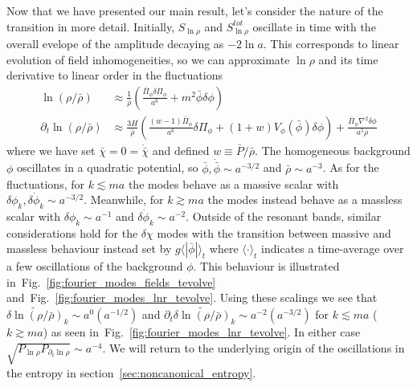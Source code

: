 \documentclass[11pt,a4paper]{article}
\newcommand{\figref}[1]{Fig.~\ref{#1}}
\begin{document}
Now that we have presented our main result, let's consider the nature of the transition in more detail.
Initially, $S_{\ln\rho}$ and $S_{\ln\rho}^{tot}$ oscillate in time with the overall evelope of the amplitude decaying as $-2\ln a$.
This corresponds to linear evolution of field inhomogeneities, so we can approximate $\ln\rho$ and its time derivative to linear order in the fluctuations
\begin{align}
  \ln(\rho/\bar{\rho}) &\approx  \frac{1}{\bar{\rho}}\left(\frac{\bar{\Pi}_\phi\delta\Pi_\phi}{a^6} + m^2\bar{\phi}\delta\phi \right) \\
  \partial_t\ln(\rho/\bar{\rho}) &\approx \frac{3H}{\bar{\rho}}\left(\frac{(w-1)\bar{\Pi}_\phi}{a^6}\delta\Pi_\phi + (1+w)V_\phi(\bar{\phi})\delta\phi \right) + \frac{\bar{\Pi}_\phi\nabla^2\delta\phi}{a^5\bar{\rho}} 
\end{align}
where we have set $\bar{\chi}=0=\dot{\bar{\chi}}$ and defined $w \equiv \bar{P}/\bar{\rho}$.
The homogeneous background $\phi$ oscillates in a quadratic potential, so $\bar{\phi},\dot{\bar{\phi}} \sim a^{-3/2}$ and $\bar{\rho} \sim a^{-3}$.
As for the fluctuations, for $k \lesssim ma$ the modes behave as a massive scalar with $\delta\phi_k,\delta\dot{\phi}_k \sim a^{-3/2}$.
Meanwhile, for $k \gtrsim ma$ the modes instead behave as a massless scalar with $\delta\phi_k \sim a^{-1}$ and $\delta\dot{\phi}_k \sim a^{-2}$.
Outside of the resonant bands, similar considerations hold for the $\delta\chi$ modes with the transition between massive and massless behaviour instead set by $g\langle|\bar{\phi}|\rangle_{t}$ 
where $\langle\cdot\rangle_t$ indicates a time-average over a few oscillations of the background $\phi$.
This behaviour is illustrated in~\figref{fig:fourier_modes_fields_tevolve} and~\figref{fig:fourier_modes_lnr_tevolve}.
Using these scalings we see that $\widetilde{\delta\ln(\rho/\bar{\rho})}_k \sim a^0 (a^{-1/2})$ and 
$\partial_t\widetilde{\delta\ln(\rho/\bar{\rho})}_k \sim a^{-2} (a^{-3/2})$ for $k \lesssim ma$ ($k \gtrsim ma$) as seen in~\figref{fig:fourier_modes_lnr_tevolve}.
In either case $\sqrt{P_{\ln\rho}P_{\partial_t\ln\rho}} \sim a^{-4}$.
We will return to the underlying origin of the oscillations in the entropy in section~\ref{sec:noncanonical_entropy}.
\end{document}
